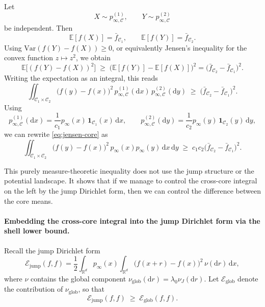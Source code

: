 Let
\[
X\sim p_{\infty,\mathcal C}^{(1)},\qquad
Y\sim p_{\infty,\mathcal C}^{(2)}
\]
be independent.
Then
\[
\mathbb E[f(X)]=\bar f_{\mathcal C_1},\qquad
\mathbb E[f(Y)]=\bar f_{\mathcal C_2}.
\]
Using \(\mathrm{Var}(f(Y)-f(X))\ge 0\), or equivalently Jensen’s inequality
for the convex function \(z\mapsto z^2\), we obtain
\[
\mathbb E\bigl[(f(Y)-f(X))^2\bigr]
\;\ge\;
\bigl(\mathbb E[f(Y)]-\mathbb E[f(X)]\bigr)^2
=
\bigl(\bar f_{\mathcal C_2}-\bar f_{\mathcal C_1}\bigr)^2.
\]
Writing the expectation as an integral, this reads
\begin{equation}\label{eq:jensen-core}
\iint_{\mathcal C_1\times\mathcal C_2}
\bigl(f(y)-f(x)\bigr)^2\,
p_{\infty,\mathcal C}^{(1)}(\mathrm dx)\,
p_{\infty,\mathcal C}^{(2)}(\mathrm dy)
\;\ge\;
\bigl(\bar f_{\mathcal C_2}-\bar f_{\mathcal C_1}\bigr)^2.
\end{equation}
Using
\[
p_{\infty,\mathcal C}^{(1)}(\mathrm dx)
=
\frac{1}{c_1}p_\infty(x)\,\mathbf 1_{\mathcal C_1}(x)\,\mathrm dx,
\qquad
p_{\infty,\mathcal C}^{(2)}(\mathrm dy)
=
\frac{1}{c_2}p_\infty(y)\,\mathbf 1_{\mathcal C_2}(y)\,\mathrm dy,
\]
we can rewrite \eqref{eq:jensen-core} as
\begin{equation}\label{eq:jensen-core-weighted}
\iint_{\mathcal C_1\times\mathcal C_2}
\bigl(f(y)-f(x)\bigr)^2\,
p_\infty(x)p_\infty(y)\,\mathrm dx\,\mathrm dy
\;\ge\;
c_1c_2\bigl(\bar f_{\mathcal C_2}-\bar f_{\mathcal C_1}\bigr)^2.
\end{equation}

This purely measure-theoretic inequality does not use the jump structure
or the potential landscape.
It shows that if we manage to control the cross-core integral on the left
by the jump Dirichlet form, then we can control the difference between the
core means.

\paragraph{Embedding the cross-core integral into the jump Dirichlet form via the shell lower bound.}

Recall the jump Dirichlet form
\[
\mathcal E_{\mathrm{jump}}(f,f)
=
\frac12\int_{\mathbb R^d} p_\infty(x)\int_{\mathbb R^d}
\bigl(f(x+r)-f(x)\bigr)^2\,\nu(\mathrm dr)\,\mathrm dx,
\]
where \(\nu\) contains the global component
\(\nu_{\mathrm{glob}}(\mathrm dr)=\lambda_0\nu_J(\mathrm dr)\).
Let \(\mathcal E_{\mathrm{glob}}\) denote the contribution of \(\nu_{\mathrm{glob}}\),
so that
\[
\mathcal E_{\mathrm{jump}}(f,f)
\;\ge\;
\mathcal E_{\mathrm{glob}}(f,f).
\]

